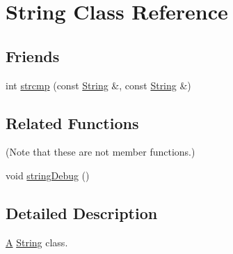 \hypertarget{class_string}{\section{String Class Reference}
\label{class_string}
}
\subsection*{Friends}
\begin{DoxyCompactItemize}
\item 
int \hyperlink{class_string_ae3c243f0bc797b9e4b15d2ef5e5aaa7c}{strcmp} (const \hyperlink{class_string}{String} \&, const \hyperlink{class_string}{String} \&)
\end{DoxyCompactItemize}
\subsection*{Related Functions}
(Note that these are not member functions.) \begin{DoxyCompactItemize}
\item 
void \hyperlink{class_string_a5c07384b505d25ae6f61fc7abf0b0e61}{string\-Debug} ()
\end{DoxyCompactItemize}


\subsection{Detailed Description}
\hyperlink{class_a}{A} \hyperlink{class_string}{String} class. 


